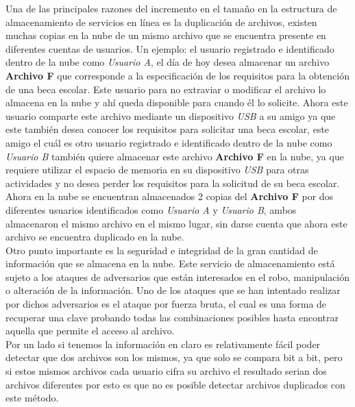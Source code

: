 Una de las principales razones del incremento en el tamaño en la estructura de almacenamiento de servicios en línea es la duplicación de archivos, existen muchas copias en la nube de un mismo archivo que se encuentra presente en diferentes cuentas de usuarios. Un ejemplo: el usuario registrado e identificado dentro de la nube como \textit{Usuario A}, el día de hoy desea almacenar un archivo \textbf{Archivo F} que corresponde a la especificación de los requisitos para la obtención de una beca escolar. Este usuario para no extraviar o modificar el archivo lo almacena en la nube y ahí queda disponible para cuando él lo solicite. Ahora este usuario comparte este archivo mediante un dispositivo \textit{USB} a su amigo ya que este también desea conocer los requisitos para solicitar una beca escolar, este amigo el cuál es otro usuario registrado e identificado dentro de la nube como \textit{Usuario B} también quiere almacenar este archivo \textbf{Archivo F} en la nube, ya que requiere utilizar el espacio de memoria en su dispositivo \textit{USB} para otras actividades y no desea perder los requisitos para la solicitud de su beca escolar. \\

Ahora en la nube se encuentran almacenados 2 copias del \textbf{Archivo F} por dos diferentes usuarios identificados como \textit{Usuario A} y \textit{Usuario B}, ambos almacenaron el mismo archivo en el mismo lugar, sin darse cuenta que ahora este archivo se encuentra duplicado en la nube. \\

Otro punto importante es la seguridad e integridad de la gran cantidad de información que se almacena en la nube. Este servicio de almacenamiento está sujeto a los ataques de adversarios que están interesados en el robo, manipulación o alteración de la información. Uno de los ataques que se han intentado realizar por dichos adversarios es el ataque por fuerza bruta, el cual es una forma de recuperar una clave probando todas las combinaciones posibles hasta encontrar aquella que permite el acceso al archivo. \\

Por un lado si tenemos la información en claro es relativamente fácil poder detectar que dos archivos son los mismos, ya que solo se compara bit a bit, pero si estos mismos archivos cada usuario cifra su archivo el resultado serian dos archivos diferentes por esto es que no es posible detectar archivos duplicados con este método. \\
 \\  \\



